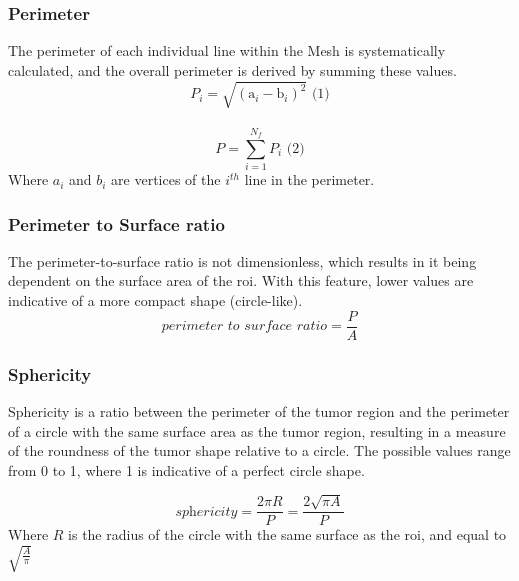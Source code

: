 \subsubsection*{Perimeter}
The perimeter of each individual line within the Mesh is systematically calculated, and the overall perimeter is derived by summing these values.
\begin{equation}
    P_i = \sqrt{(\text{a}_i-\text{b}_i)^2} \text{ (1)}
\end{equation}\\
\begin{equation}
    P = \displaystyle\sum^{N_f}_{i=1}{P_i} \text{ (2)}
\end{equation}
Where $a_i$ and $b_i$ are vertices of the $i^{th}$ line in the perimeter.
\subsubsection*{Perimeter to Surface ratio}
The perimeter-to-surface ratio is not dimensionless, which results in it being dependent on the surface area of the \ac{roi}. With this feature, lower values are indicative of a more compact shape (circle-like).
\begin{equation}
    \textit{perimeter to surface ratio} = \frac{P}{A}
\end{equation}

\subsubsection*{Sphericity}
Sphericity is a ratio between the perimeter of the tumor region and the perimeter of a circle with the same surface area as the tumor region, resulting in a measure of the roundness of the tumor shape relative to a circle.
The possible values range from 0 to 1, where 1 is indicative of a perfect circle shape.

\begin{equation}
    \textit{sphericity} = \frac{2\pi R}{P} = \frac{2\sqrt{\pi A}}{P}
\end{equation}
Where $R$ is the radius of the circle with the same surface as the \ac{roi}, and equal to $\sqrt{\frac{A}{\pi}}$


